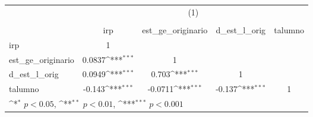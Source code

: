 {
\def\sym#1{\ifmmode^{#1}\else\(^{#1}\)\fi}
\begin{tabular}{l*{4}{c}}
\hline\hline
          &\multicolumn{4}{c}{(1)}                                                    \\
          &\multicolumn{4}{c}{}                                                       \\
          &      irp         &est\_ge\_originario         &d\_est\_l\_orig         &  talumno         \\
\hline
irp       &        1         &                  &                  &                  \\
est\_ge\_originario&   0.0837\sym{***}&        1         &                  &                  \\
d\_est\_l\_orig&   0.0949\sym{***}&    0.703\sym{***}&        1         &                  \\
talumno   &   -0.143\sym{***}&  -0.0711\sym{***}&   -0.137\sym{***}&        1         \\
\hline\hline
\multicolumn{5}{l}{\footnotesize \sym{*} \(p<0.05\), \sym{**} \(p<0.01\), \sym{***} \(p<0.001\)}\\
\end{tabular}
}
